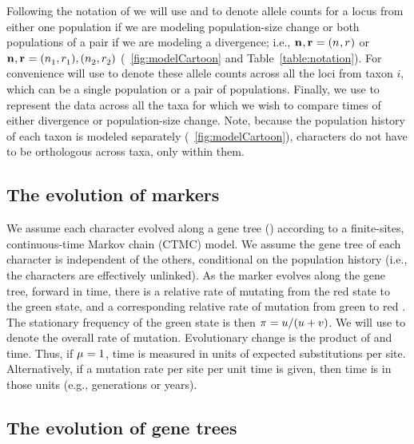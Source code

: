 \ifembed{

}{}

Following the notation of \citet{Oaks2018ecoevolity}
we will use \leafallelecounts and \leafredallelecounts to denote allele counts
for a locus from either one population if we are modeling population-size
change or both populations of a pair if we are modeling a divergence; i.e., 
$\leafallelecounts, \leafredallelecounts = (\allelecount, \redallelecount)$
or
$\leafallelecounts, \leafredallelecounts = (\allelecount[1],
\redallelecount[1]), (\allelecount[2], \redallelecount[2])$
(\fig{}~\ref{fig:modelCartoon}
and
Table~\ref{table:notation}).
For convenience will use \comparisondata[i] to denote these allele counts
across all the loci from taxon $i$, which can be a single population
or a pair of populations.
Finally, we use \alldata to represent the data across all the taxa for which we
wish to compare times of either divergence or population-size change.
Note, because the population history of each taxon is modeled separately
(\fig{}~\ref{fig:modelCartoon}),
characters do not have to be orthologous across taxa, only within them.


\subsection{The evolution of markers}

We assume each character evolved along a gene tree (\genetree)
according to a finite-sites, continuous-time Markov chain (CTMC) model.
We assume the gene tree of each character is independent of the others,
conditional on the population history (i.e., the characters are effectively
unlinked).
As the marker evolves along the gene tree, forward in time, there is a relative
rate \rgmurate of mutating from the red state to the green state,
and a corresponding relative rate \grmurate of mutation from green to red
\citep{Bryant2012,Oaks2018ecoevolity}.
The stationary frequency of the green state is then
$\gfreq = \rgmurate / (\rgmurate + \grmurate)$.
We will use \murate to denote the overall rate of mutation.
Evolutionary change is the product of \murate and time.
Thus, if $\murate = 1$, time is measured in
units of expected substitutions per site.
Alternatively, if a mutation rate per site per unit time is given, then time is
in those units (e.g., generations or years).

\subsection{The evolution of gene trees}

